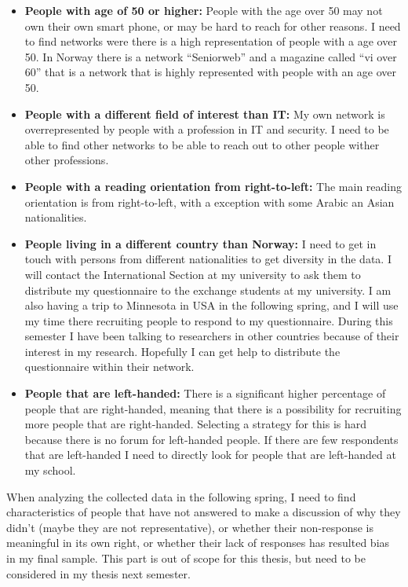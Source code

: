     \begin{itemize}
      \item {\bf People with age of 50 or higher:} People with the age over 50 may not own their own smart phone, or may be hard to reach for other reasons. I need to find networks were there is a high representation of people with a age over 50. In Norway there is a network ``Seniorweb'' and a magazine called ``vi over 60'' that is a network that is highly represented with people with an age over 50.
      \item {\bf People with a different field of interest than IT:} My own network is overrepresented by people with a profession in IT and security. I need to be able to find other networks to be able to reach out to other people wither other professions.
      \item {\bf People with a reading orientation from right-to-left:} The main reading orientation is from right-to-left, with a exception with some Arabic an Asian nationalities.
      \item {\bf People living in a different country than Norway:} I need to get in touch with persons from different nationalities to get diversity in the data. I will contact the International Section at my university to ask them to distribute my questionnaire to the exchange students at my university. I am also having a trip to Minnesota in USA in the following spring, and I will use my time there recruiting people to respond to my questionnaire. During this semester I have been talking to researchers in other countries because of their interest in my research. Hopefully I can get help to distribute the questionnaire within their network.
      \item {\bf People that are left-handed:} There is a significant higher percentage of people that are right-handed, meaning that there is a possibility for recruiting more people that are right-handed. Selecting a strategy for this is hard because there is no forum for left-handed people. If there are few respondents that are left-handed I need to directly look for people that are left-handed at my school.
    \end{itemize}

    When analyzing the collected data in the following spring, I need to find characteristics of people that have not answered to make a discussion of why they didn't (maybe they are not representative), or whether their non-response is meaningful in its own right, or whether their lack of responses has resulted bias in my final sample. This part is out of scope for this thesis, but need to be considered in my thesis next semester.
  
